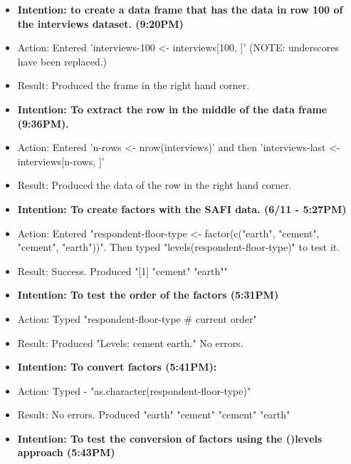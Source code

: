 \documentclass[a4paper,12pt]{article}
\begin{document}
\begin{itemize}
\item \textbf{Intention: to create a data frame that has the data in row 100 of the interviews dataset. (9:20PM)}


\item Action: Entered 'interviews-100 <- interviews[100, ]' (NOTE: underscores have been replaced.)


\item Result: Produced the frame in the right hand corner. 


\item \textbf{Intention: To extract the row in the middle of the data frame (9:36PM).}


\item Action: Entered 'n-rows <- nrow(interviews)' and then 'interviews-last <- interviews[n-rows, ]'


\item Result: Produced the data of the row in the right hand corner.


\item \textbf{Intention: To create factors with the SAFI data. (6/11 - 5:27PM)}


\item Action: Entered "respondent-floor-type <- factor(c("earth", "cement", "cement", "earth"))". Then typed "levels(respondent-floor-type)" to test it.


\item Result: Success. Produced "[1] "cement" "earth""


\item \textbf{Intention: To test the order of the factors (5:31PM)}


\item Action: Typed "respondent-floor-type # current order" 


\item Result: Produced "Levels: cement earth." No errors. 


\item \textbf{Intention: To convert factors (5:41PM):}


\item Action: Typed - "as.character(respondent-floor-type)"


\item Result: No errors. Produced "earth"  "cement" "cement" "earth" 


\item \textbf{Intention: To test the conversion of factors using the ()levels approach (5:43PM)}



\end{itemize}
\end{document}
